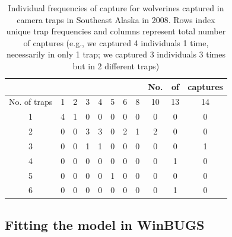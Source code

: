 \begin{table} [ht]
\caption{Individual frequencies of capture for wolverines captured in camera traps in Southeast Alaska in 2008. Rows index unique trap frequencies and columns represent total number of captures (e.g., we captured 4 individuals 1 time, necessarily in only 1 trap; we captured 3 individuals 3 times but in 2 different traps)}
\centering
\begin{tabular}{c c c c c c c c c c c}
\hline
 & & & & & & & &  No.&of&captures \\
\hline
No. of traps & 1 & 2 & 3 & 4 & 5 & 6 & 8 & 10 &13 &14 \\
\hline
1 & 4 & 1 & 0 & 0 & 0 & 0 & 0 & 0 & 0 & 0 \\
2 & 0 & 0 & 3 & 3 & 0 & 2 & 1 & 2 & 0 & 0 \\ 
3 & 0 & 0 & 1 & 1 & 0 & 0 & 0 & 0 & 0 & 1 \\
4 & 0 & 0 & 0 & 0 & 0 & 0 & 0 & 0 & 1 & 0 \\
5 & 0 & 0 & 0 & 0 & 1 & 0 & 0 & 0 & 0 & 0 \\
6 & 0 & 0 & 0 & 0 & 0 & 0 & 0 & 0 & 1 & 0 \\
\hline
\end{tabular}

\end{table} 


\subsection{Fitting the model in WinBUGS}


